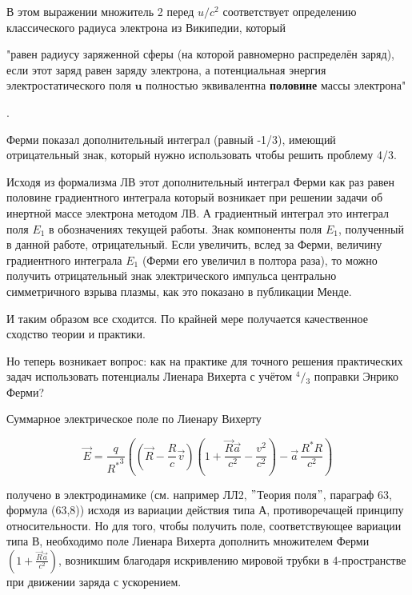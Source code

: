 \documentclass[12pt]{article}
\begin{document}
В этом выражении множитель 2 перед ${u}/{c^2}$ соответствует определению классического радиуса электрона из Википедии, который \begin{itshape}"равен радиусу заряженной сферы (на которой равномерно распределён заряд), если этот заряд равен заряду электрона, а потенциальная энергия электростатического поля $\textbf{u}$ полностью эквивалентна \textbf{половине} массы электрона"\end{itshape}.



Ферми показал дополнительный интеграл (равный -1/3), имеющий отрицательный знак, который нужно использовать чтобы решить проблему 4/3.

Исходя из формализма ЛВ этот дополнительный интеграл Ферми как раз равен половине градиентного интеграла который возникает при решении задачи об инертной массе электрона методом ЛВ. А градиентный интеграл это интеграл поля $E_1$ в обозначениях текущей работы. Знак компоненты поля $E_1$, полученный в данной работе, отрицательный. Если увеличить, вслед за Ферми, величину градиентного интеграла $E_1$ (Ферми его увеличил в полтора раза), то можно получить отрицательный знак электрического импульса центрально симметричного взрыва плазмы, как это показано в публикации Менде.

И таким образом все сходится. По крайней мере получается качественное сходство теории и практики.

Но теперь возникает вопрос: как на практике для точного решения практических задач использовать потенциалы Лиенара Вихерта с учётом ${}^{4}/{}_{3}$ поправки Энрико Ферми?


Суммарное электрическое поле по Лиенару Вихерту

$$\vec{E} = \frac{q}{{{R}^{*}}^{3}}\left( \left(\vec{R}-\frac{R}{c}\vec{v} \right) \left(1 + \frac{\vec{R}\vec{a}}{c^2} - \frac{v^2}{c^2} \right) - \vec{a}\,\frac{{R}^{*}R}{c^2} \right)$$

получено в электродинамике (см. например ЛЛ2, $"$Теория поля$"$, параграф 63, формула (63,8)) исходя из вариации действия типа А, противоречащей принципу относительности. Но для того, чтобы получить поле, соответствующее вариации типа В, необходимо поле Лиенара Вихерта дополнить множителем Ферми $\left(1 + \frac{\vec{R}\vec{a}}{c^2}\right)$, возникшим благодаря искривлению мировой трубки в 4-пространстве при движении заряда с ускорением.
\end{document}
